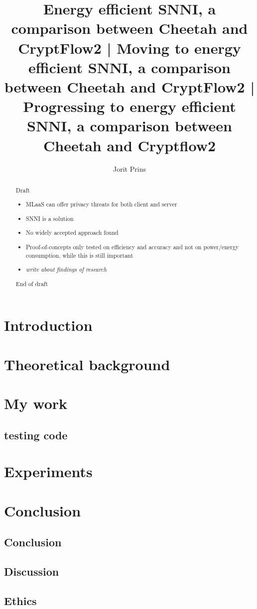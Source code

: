 \documentclass[twoside]{Style/uva-inf-bachelor-thesis}
\title{Energy efficient SNNI, a comparison between Cheetah and CryptFlow2 | Moving to energy efficient SNNI, a comparison between Cheetah and CryptFlow2 | Progressing to energy efficient SNNI, a comparison between Cheetah and Cryptflow2}
\author{Jorit Prins}
\begin{document}
\maketitle

\begin{abstract}
\color{red}Draft\color{red}
\begin{itemize}
    \item MLaaS can offer privacy threats for both client and server
    \item SNNI is a solution
    \item No widely accepted approach found
    \item Proof-of-concepts only tested on efficiency and accuracy and not on power/energy consumption, while this is still important
    \item \textit{write about findings of research}
\end{itemize}
\color{red}End of draft\color{red}

\end{abstract}

\tableofcontents

\chapter{Introduction}\label{chap:introduction}


\chapter{Theoretical background}\label{chap:theoreticalbackground}


\chapter{My work}\label{chap:mywork}

\section{testing code}

\chapter{Experiments}\label{chap:experiments}

% 


\chapter{Conclusion}\label{chap:conclusion}
\section{Conclusion}
\section{Discussion}
\section{Ethics}


\printbibliography
\end{document}
